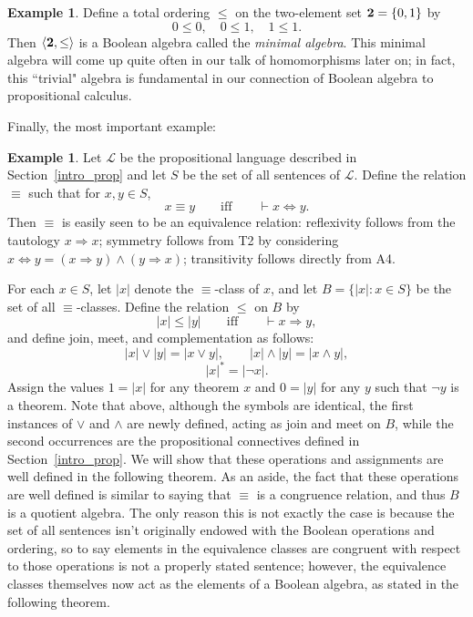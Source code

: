 \documentclass[11pt,titlepage]{article}
\newcommand{\spifff}{\qquad\text{iff}\qquad}
\newcommand{\imp}{\Rightarrow}
\newcommand{\ifff}{\Leftrightarrow}
\newcommand{\Lan}{\mathcal{L}}
\theoremstyle{definition}
\newtheorem{example}[definition]{Example}
\begin{document}
\begin{example} Define a total ordering $\leq$ on the two-element set ${\bf 2}=\{0,1\}$ by $$0\leq 0,\quad 0\leq 1,\quad 1\leq 1.$$ Then $\langle {\bf 2}, \leq\rangle$ is a Boolean algebra called the {\em minimal algebra}. This minimal algebra will come up quite often in our talk of homomorphisms later on; in fact, this ``trivial" algebra is fundamental in our connection of Boolean algebra to propositional calculus.
\end{example}

Finally, the most important example:
\begin{example}\label{lb.ex} Let $\Lan$ be the propositional language described in Section~\ref{intro_prop} and let $S$ be the set of all sentences of $\Lan$. Define the relation $\equiv$ such that for $x,y\in S$, $$x\equiv y \spifff \vdash x\ifff y.$$ Then $\equiv$ is easily seen to be an equivalence relation: reflexivity follows from the tautology $x\imp x$; symmetry follows from T2 by considering $x\ifff y = (x\imp y) \land (y\imp x)$; transitivity follows directly from A4.

For each $x\in S$, let $|x|$ denote the $\equiv$-class of $x$, and let $B=\{|x|:x\in S\}$ be the set of all $\equiv$-classes. Define the relation $\leq$ on $B$ by $$|x|\leq |y| \spifff \vdash x\imp y,$$ and define join, meet, and complementation as follows: $$|x|\lor |y| = |x\lor y|, \qquad |x|\land |y|=|x\land y|, $$ $$ |x|^*=|\neg x|.$$ Assign the values $1=|x|$ for any theorem $x$ and $0=|y|$ for any $y$ such that $\neg y$ is a theorem. Note that above, although the symbols are identical, the first instances of $\lor$ and $\land$ are newly defined, acting as join and meet on $B$, while the second occurrences are the propositional connectives defined in Section~\ref{intro_prop}. We will show that these operations and assignments are well defined in the following theorem. As an aside, the fact that these operations are well defined is similar to saying that $\equiv$ is a congruence relation, and thus $B$ is a quotient algebra. The only reason this is not exactly the case is because the set of all sentences isn't originally endowed with the Boolean operations and ordering, so to say elements in the equivalence classes are congruent with respect to those operations is not a properly stated sentence; however, the equivalence classes themselves now act as the elements of a Boolean algebra, as stated in the following theorem.
\end{example}
\end{document}
